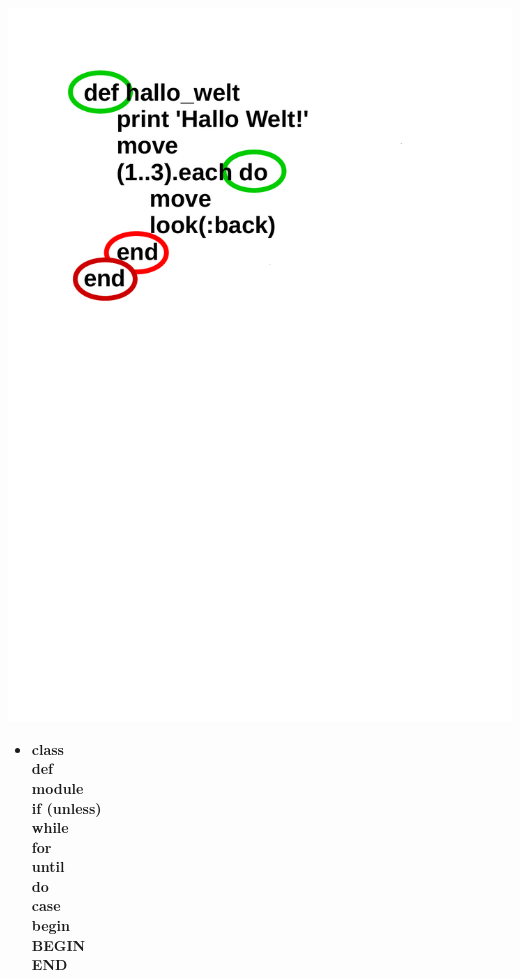 \begin{frame}
	\begin{center}
		\includegraphics[scale=0.4]{scopes/beispiel2.pdf}
	\end{center}
\end{frame}

\begin{frame}
	\begin{itemize}
		\item[]\textbf{class\\ def\\ module\\ if (unless)\\ while\\ for\\ until\\ do\\ case\\ begin\\ BEGIN\\ END\\}
	\end{itemize}
\end{frame}

